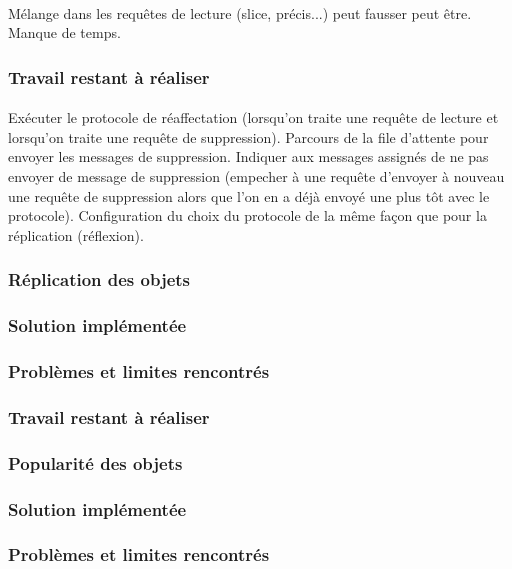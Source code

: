 \documentclass[12pt]{article}
\begin{document}
\paragraph{}Mélange dans les requêtes de lecture (slice, précis...) peut fausser peut être. Manque de temps.

\subsubsection*{Travail restant à réaliser}

\paragraph{}Exécuter le protocole de réaffectation (lorsqu'on traite une requête de lecture et lorsqu'on traite une requête de suppression). Parcours de la file d'attente pour envoyer les messages de suppression. Indiquer aux messages assignés de ne pas envoyer de message de suppression (empecher à une requête d'envoyer à nouveau une requête de suppression alors que l'on en a déjà envoyé une plus tôt avec le protocole). Configuration du choix du protocole de la même façon que pour la réplication (réflexion).

\subsubsection{Réplication des objets}

\subsubsection*{Solution implémentée}
\subsubsection*{Problèmes et limites rencontrés}
\subsubsection*{Travail restant à réaliser}

\subsubsection{Popularité des objets}

\subsubsection*{Solution implémentée}
\subsubsection*{Problèmes et limites rencontrés}
\end{document}
